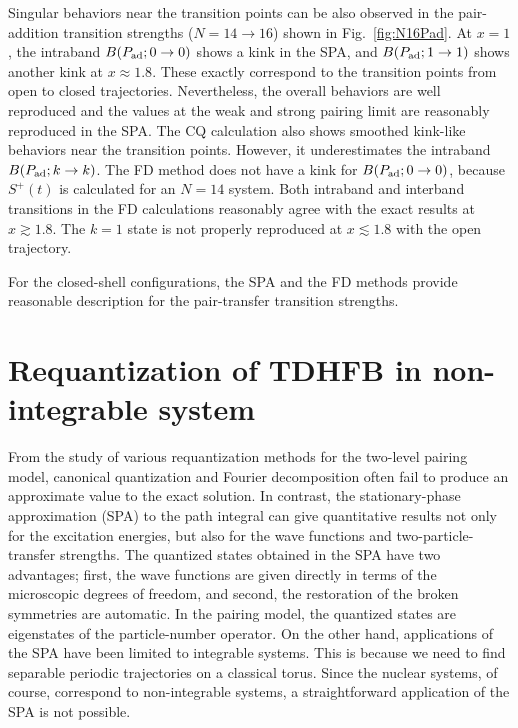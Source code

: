 \documentclass[11pt]{book} %
\begin{document}
Singular behaviors near the transition points can be also observed in
the pair-addition transition strengths ($N=14\rightarrow 16$) shown
in Fig.~\ref{fig:N16Pad}. 
At $x=1$, the intraband $B(P_{\rm ad}; 0\rightarrow 0)$ shows a kink
in the SPA,
and $B(P_{\rm ad}; 1\rightarrow 1)$ shows another kink at $x\approx 1.8$.
These exactly correspond to the transition points from open to closed
trajectories.
Nevertheless, the overall behaviors are well reproduced and
the values at the weak and strong pairing limit are reasonably reproduced
in the SPA.
The CQ calculation also shows smoothed kink-like behaviors near the
transition points.
However, it underestimates the intraband $B(P_{\rm ad}; k\rightarrow k)$.
The FD method does not have a kink for $B(P_{\rm ad}; 0\rightarrow 0)$,
because $S^+(t)$ is calculated for an $N=14$ system.
Both intraband and interband transitions in the FD calculations
reasonably agree with the exact results at $x\gtrsim 1.8$.
The $k=1$ state is not properly reproduced at $x\lesssim 1.8$
with the open trajectory.

For the closed-shell configurations,
the SPA and the FD methods provide reasonable description for the
pair-transfer transition strengths.


\clearpage{\pagestyle{empty}\cleardoublepage}
\chapter{Requantization of TDHFB in non-integrable system}
\label{non-integrable}

From the study of various requantization methods for the two-level pairing model,
canonical quantization and Fourier decomposition often fail to produce an approximate value to the exact solution.
In contrast,
the stationary-phase approximation (SPA) to the path integral \cite{SM88} 
can give quantitative results not only for the excitation energies, 
but also for the wave functions and two-particle-transfer strengths.
The quantized states obtained in the SPA have two advantages;
first, the wave functions are given directly in terms of
the microscopic degrees of freedom, and second,
the restoration of the broken symmetries are automatic.
In the pairing model, the quantized states are eigenstates of the particle-number
operator.
On the other hand, applications of the SPA have been limited to
integrable systems.
This is because we need to find separable periodic trajectories on a classical
torus.
Since the nuclear systems, of course, correspond to non-integrable systems,
a straightforward application of the SPA is not possible.
\end{document}
